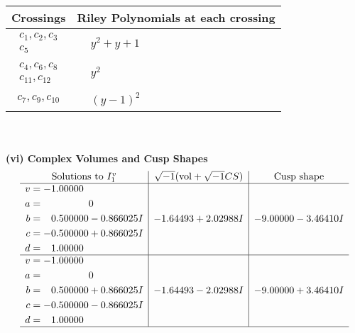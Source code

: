 \documentclass[1p]{elsarticle_modified}
\theoremstyle{definition}
\newcommand{\I}{\sqrt{-1}}
\begin{document}
\begin{tabular}{m{50pt}|m{274pt}}
Crossings & \hspace{64pt}Riley Polynomials at each crossing \\
\hline $$\begin{aligned}c_{1},c_{2},c_{3}\\c_{5}\end{aligned}$$&$\begin{aligned}
&y^2+y+1
\end{aligned}$\\
\hline $$\begin{aligned}c_{4},c_{6},c_{8}\\c_{11},c_{12}\end{aligned}$$&$\begin{aligned}
&y^2
\end{aligned}$\\
\hline $$\begin{aligned}c_{7},c_{9},c_{10}\end{aligned}$$&$\begin{aligned}
&(y-1)^2
\end{aligned}$\\
\hline
\end{tabular}\\~\\
\newpage\flushleft \textbf{(vi) Complex Volumes and Cusp Shapes}
$$\begin{array}{c|c|c}  
\text{Solutions to }I^v_{1}& \I (\text{vol} + \sqrt{-1}CS) & \text{Cusp shape}\\
 \hline 
\begin{aligned}
v &= -1.00000\phantom{ +0.000000I} \\
a &= \phantom{-0.000000 } 0 \\
b &= \phantom{-}0.500000 - 0.866025 I \\
c &= -0.500000 + 0.866025 I \\
d &= \phantom{-}1.00000\phantom{ +0.000000I}\end{aligned}
 & -1.64493 + 2.02988 I & -9.00000 - 3.46410 I \\ \hline\begin{aligned}
v &= -1.00000\phantom{ +0.000000I} \\
a &= \phantom{-0.000000 } 0 \\
b &= \phantom{-}0.500000 + 0.866025 I \\
c &= -0.500000 - 0.866025 I \\
d &= \phantom{-}1.00000\phantom{ +0.000000I}\end{aligned}
 & -1.64493 - 2.02988 I & -9.00000 + 3.46410 I\\
 \hline 
 \end{array}$$\newpage
\end{document}
